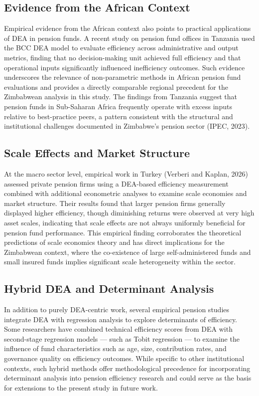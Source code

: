 \documentclass[12pt,a4paper]{article}
\begin{document}
\subsection{Evidence from the African Context}

Empirical evidence from the African context also points to practical applications of DEA in pension funds. A recent study on pension fund offices in Tanzania used the BCC DEA model to evaluate efficiency across administrative and output metrics, finding that no decision-making unit achieved full efficiency and that operational inputs significantly influenced inefficiency outcomes. Such evidence underscores the relevance of non-parametric methods in African pension fund evaluations and provides a directly comparable regional precedent for the Zimbabwean analysis in this study. The findings from Tanzania suggest that pension funds in Sub-Saharan Africa frequently operate with excess inputs relative to best-practice peers, a pattern consistent with the structural and institutional challenges documented in Zimbabwe's pension sector (IPEC, 2023).

\subsection{Scale Effects and Market Structure}

At the macro sector level, empirical work in Turkey (Verberi and Kaplan, 2026) assessed private pension firms using a DEA-based efficiency measurement combined with additional econometric analyses to examine scale economies and market structure. Their results found that larger pension firms generally displayed higher efficiency, though diminishing returns were observed at very high asset scales, indicating that scale effects are not always uniformly beneficial for pension fund performance. This empirical finding corroborates the theoretical predictions of scale economics theory and has direct implications for the Zimbabwean context, where the co-existence of large self-administered funds and small insured funds implies significant scale heterogeneity within the sector.

\subsection{Hybrid DEA and Determinant Analysis}

In addition to purely DEA-centric work, several empirical pension studies integrate DEA with regression analysis to explore determinants of efficiency. Some researchers have combined technical efficiency scores from DEA with second-stage regression models --- such as Tobit regression --- to examine the influence of fund characteristics such as age, size, contribution rates, and governance quality on efficiency outcomes. While specific to other institutional contexts, such hybrid methods offer methodological precedence for incorporating determinant analysis into pension efficiency research and could serve as the basis for extensions to the present study in future work.
\end{document}
